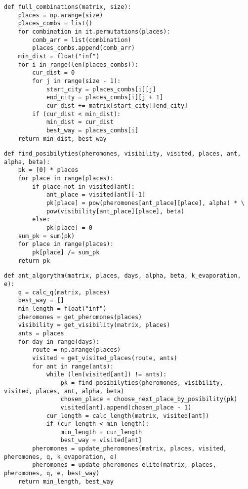 \clearpage

\begin{center}
    \captionsetup{justification=raggedright,singlelinecheck=off}
    \begin{lstlisting}[label=lst:full_comb,caption=Алгоритм полного перебора путей]
def full_combinations(matrix, size):
	places = np.arange(size)
	places_combs = list()
	for combination in it.permutations(places):
		comb_arr = list(combination)
		places_combs.append(comb_arr)
	min_dist = float("inf")
	for i in range(len(places_combs)):
		cur_dist = 0
		for j in range(size - 1):
			start_city = places_combs[i][j]
			end_city = places_combs[i][j + 1]
			cur_dist += matrix[start_city][end_city]
		if (cur_dist < min_dist):
			min_dist = cur_dist
			best_way = places_combs[i]
	return min_dist, best_way
\end{lstlisting}
\end{center}

\begin{center}
\captionsetup{justification=raggedright,singlelinecheck=off}
\begin{lstlisting}[label=lst:prob_arr,caption=Алгоритм нахождения массива вероятностных переходов в непосещенные города]
def find_posibilyties(pheromones, visibility, visited, places, ant, alpha, beta):
	pk = [0] * places
	for place in range(places):
		if place not in visited[ant]:
			ant_place = visited[ant][-1]
			pk[place] = pow(pheromones[ant_place][place], alpha) * \
			pow(visibility[ant_place][place], beta)
		else:
			pk[place] = 0
	sum_pk = sum(pk)
	for place in range(places):
		pk[place] /= sum_pk  
	return pk
\end{lstlisting}
\end{center}
\clearpage


\begin{center}
    \captionsetup{justification=raggedright,singlelinecheck=off}
    \begin{lstlisting}[label=lst:ant_alg,caption=Муравьиный алгоритм]
def ant_algorythm(matrix, places, days, alpha, beta, k_evaporation, e):
	q = calc_q(matrix, places)
	best_way = []
	min_length = float("inf")
	pheromones = get_pheromones(places)
	visibility = get_visibility(matrix, places)
	ants = places
	for day in range(days):
		route = np.arange(places)
		visited = get_visited_places(route, ants)
		for ant in range(ants):
			while (len(visited[ant]) != ants):
				pk = find_posibilyties(pheromones, visibility, visited, places, ant, alpha, beta)  
				chosen_place = choose_next_place_by_posibility(pk)
				visited[ant].append(chosen_place - 1)
			cur_length = calc_length(matrix, visited[ant]) 
			if (cur_length < min_length):
				min_length = cur_length
				best_way = visited[ant]
		pheromones = update_pheromones(matrix, places, visited, pheromones, q, k_evaporation, e)
		pheromones = update_pheromones_elite(matrix, places, pheromones, q, e, best_way)
	return min_length, best_way
\end{lstlisting}
\end{center}


